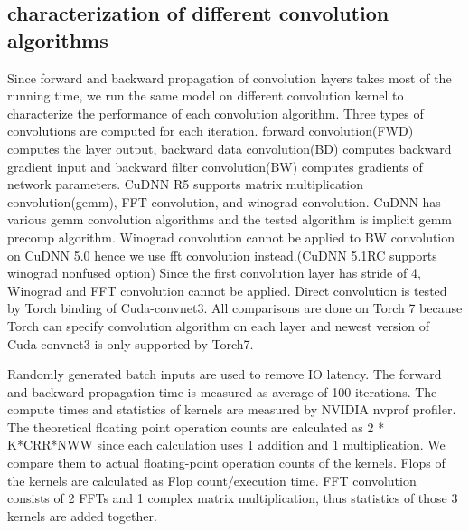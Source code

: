 
\subsection{characterization of different convolution algorithms}
Since forward and backward propagation of convolution layers takes most of the running time, we run the same model on different convolution kernel to characterize the performance of each convolution algorithm.
Three types of convolutions are computed for each iteration.
forward convolution(FWD) computes the layer output, backward data convolution(BD) computes backward gradient input and backward filter convolution(BW) computes gradients of network parameters.
CuDNN R5 supports matrix multiplication convolution(gemm), FFT convolution, and winograd convolution.
CuDNN has various gemm convolution algorithms and the tested algorithm is implicit gemm precomp algorithm.
Winograd convolution cannot be applied to BW convolution on CuDNN 5.0 hence we use fft convolution instead.(CuDNN 5.1RC supports winograd nonfused option)
Since the first convolution layer has stride of 4, Winograd and FFT convolution cannot be applied.
Direct convolution is tested by Torch binding of Cuda-convnet3.
All comparisons are done on Torch 7 because Torch can specify convolution algorithm on each layer and newest version of Cuda-convnet3 is only supported by Torch7.

Randomly generated batch inputs are used to remove IO latency.
The forward and backward propagation time is measured as average of 100 iterations.
The compute times and statistics of kernels are measured by NVIDIA nvprof profiler.
The theoretical floating point operation counts are calculated as 2 * K*CRR*NWW since each calculation uses 1 addition and 1 multiplication.
We compare them to actual floating-point operation counts of the kernels.
Flops of the kernels are calculated as Flop count/execution time.
FFT convolution consists of 2 FFTs and 1 complex matrix multiplication, thus statistics of those 3 kernels are added together.

